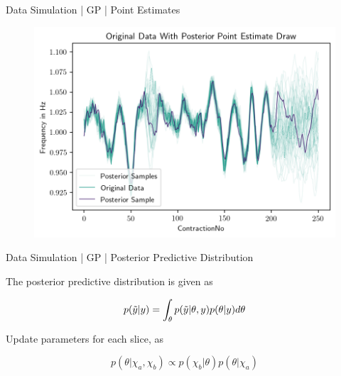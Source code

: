 \documentclass{beamer}
\begin{document}
    \begin{frame}{Data Simulation | GP | Point Estimates}
    \begin{figure}[hbt]
        	\center
        	\includegraphics[width=1.0\textwidth]{img/gp_data_example_posterior_gradient_descent.png}
        	\label{fig:posterior_point_estimaes}
        \end{figure}
    \end{frame}
    
    \begin{frame}{Data Simulation | GP | Posterior Predictive Distribution}
    
        The posterior predictive distribution is given as
    
        \begin{equation}
            p(\Tilde{y}|y) = \int_\theta p(\Tilde{y}|\theta, y) p(\theta|y)d\theta
        \end{equation}
    
        Update parameters for each slice, as
        
        \begin{equation}
            p(\theta|\chi_a,\chi_b) \propto p(\chi_b|\theta)p(\theta|\chi_a)
        \end{equation}
    \end{frame}
    
\end{document}
